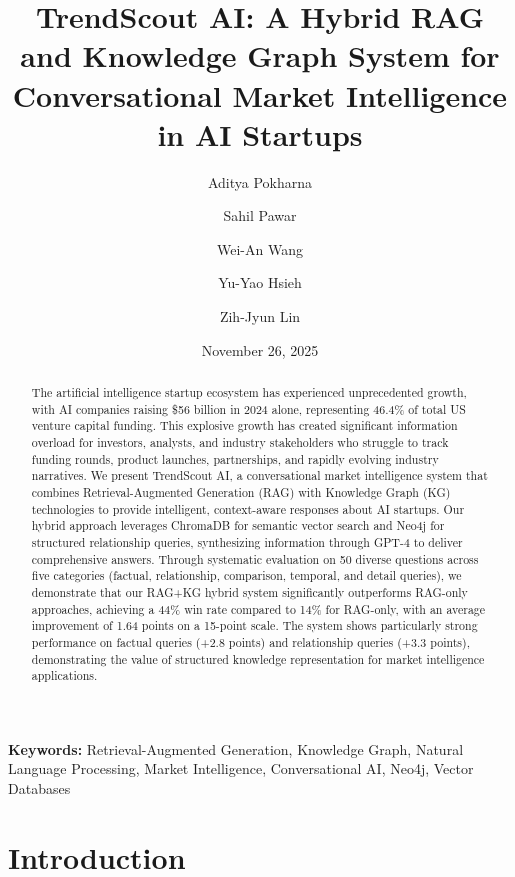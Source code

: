 \documentclass[11pt,twocolumn]{article}
\begin{document}
\title{TrendScout AI: A Hybrid RAG and Knowledge Graph System for Conversational Market Intelligence in AI Startups}

\author[1]{Aditya Pokharna}
\author[1]{Sahil Pawar}
\author[1]{Wei-An Wang}
\author[1]{Yu-Yao Hsieh}
\author[1]{Zih-Jyun Lin}

\date{November 26, 2025}

\maketitle

\begin{abstract}
The artificial intelligence startup ecosystem has experienced unprecedented growth, with AI companies raising \$56 billion in 2024 alone, representing 46.4\% of total US venture capital funding. This explosive growth has created significant information overload for investors, analysts, and industry stakeholders who struggle to track funding rounds, product launches, partnerships, and rapidly evolving industry narratives. We present TrendScout AI, a conversational market intelligence system that combines Retrieval-Augmented Generation (RAG) with Knowledge Graph (KG) technologies to provide intelligent, context-aware responses about AI startups. Our hybrid approach leverages ChromaDB for semantic vector search and Neo4j for structured relationship queries, synthesizing information through GPT-4 to deliver comprehensive answers. Through systematic evaluation on 50 diverse questions across five categories (factual, relationship, comparison, temporal, and detail queries), we demonstrate that our RAG+KG hybrid system significantly outperforms RAG-only approaches, achieving a 44\% win rate compared to 14\% for RAG-only, with an average improvement of 1.64 points on a 15-point scale. The system shows particularly strong performance on factual queries (+2.8 points) and relationship queries (+3.3 points), demonstrating the value of structured knowledge representation for market intelligence applications.
\end{abstract}

\noindent\textbf{Keywords:} Retrieval-Augmented Generation, Knowledge Graph, Natural Language Processing, Market Intelligence, Conversational AI, Neo4j, Vector Databases

\section{Introduction}
\end{document}
